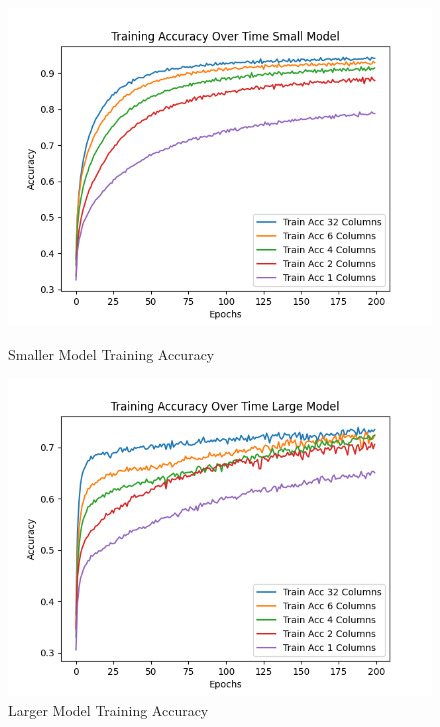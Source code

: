 \documentclass{article}
\begin{document}
\begin{figure}
		\includegraphics[width = \linewidth]{figures/train_acc_over_time_small.png}
		\caption{Smaller Model Training Accuracy}
	\endminipage\hfill
		\includegraphics[width = \linewidth]{figures/train_acc_over_time_large_model.png}
		\caption{Larger Model Training Accuracy}
	\endminipage\hfill	
\end{figure}
\end{document}

